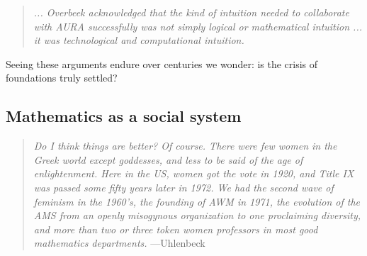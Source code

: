 \documentclass{article}
\begin{document}
\begin{quote}
{\em ... Overbeek acknowledged that the kind of intuition needed to collaborate with AURA successfully was not simply logical or mathematical intuition ...    it was technological and computational intuition.}
\end{quote}



%
%
%
%
%
%
%
%

 

%
%
%
%


Seeing these arguments  endure over centuries  we wonder: is the crisis of foundations truly settled?



 

 


%
%
%
%

  

%
%
%


%
%
%
%
%
%
%

%
%
%


%
%
%
%

%
%
%



%
%
%


\subsection{Mathematics as a social system}
\begin{quote}

%
%
%

 


%
{\em Do I think things are better? Of course. There were few women in the Greek world except goddesses, and less to be said of the age of enlightenment. Here in the US, women got the vote in 1920, and Title IX was passed some fifty years later in 1972. We had the second wave of feminism in the 1960’s, the founding of AWM in 1971, the evolution of the AMS from an openly misogynous organization to one proclaiming diversity, and more than two or three token women professors in most good mathematics departments.}   ---Uhlenbeck \cite{uhlenbeck_glass_ceiling}
\end{quote}


%
%

%




%
%
%
%
%
%

 
 

%
%
%
%
%
%

%
\end{document}
